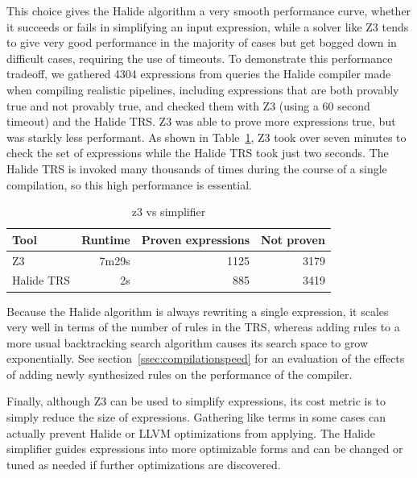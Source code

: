 \documentclass[sigplan,10pt,review,anonymous]{acmart}\settopmatter{printfolios=true,printccs=false,printacmref=false}
\begin{document}
This choice gives the Halide algorithm a very smooth performance curve, whether it succeeds or fails in simplifying an input expression, while a solver like Z3 tends to give very good performance in the majority of cases but get bogged down in difficult cases, requiring the use of timeouts. To demonstrate this performance tradeoff, we gathered 4304 expressions from queries the Halide compiler made when compiling realistic pipelines, including expressions that are both provably true and not provably true, and checked them with Z3 (using a 60 second timeout) and the Halide TRS. Z3 was able to prove more expressions true, but was starkly less performant. As shown in Table~\ref{tab:simplifiervsz3}, Z3 took over seven minutes to check the set of expressions while the Halide TRS took just two seconds. The Halide TRS is invoked many thousands of times during the course of a single compilation, so this high performance is essential.

\begin{table}
\caption{z3 vs simplifier}
\begin{tabular}{l|r|r|r}
Tool & Runtime & Proven expressions & Not proven \\
\hline
Z3 & 7m29s & 1125 & 3179 \\
Halide TRS & 2s & 885 & 3419 
\end{tabular}
\label{tab:simplifiervsz3}
\end{table}

Because the Halide algorithm is always rewriting a single expression, it scales very well in terms of the number of rules in the TRS, whereas adding rules to a more usual backtracking search algorithm causes its search space to grow exponentially. See section~\ref{ssec:compilationspeed} for an evaluation of the effects of adding newly synthesized rules on the performance of the compiler. 

Finally, although Z3 can be used to simplify expressions, its cost metric is to simply reduce the size of expressions. Gathering like terms in some cases can actually prevent Halide or LLVM optimizations from applying. The Halide simplifier guides expressions into more optimizable forms and can be changed or tuned as needed if further optimizations are discovered. 

\end{document}
